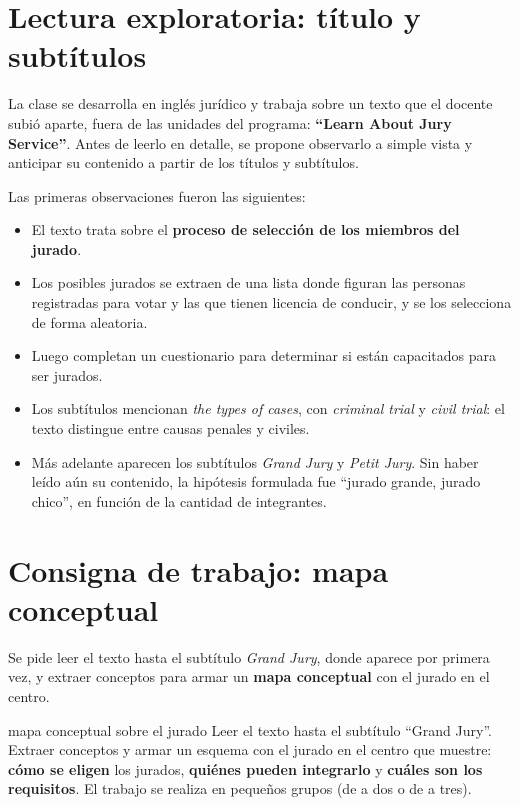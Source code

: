 \documentclass[12pt,oneside]{book}
\begin{document}
\section{Lectura exploratoria: título y subtítulos}

La clase se desarrolla en inglés jurídico y trabaja sobre un texto que el docente subió aparte, fuera de las unidades del programa: \textbf{``Learn About Jury Service''}. Antes de leerlo en detalle, se propone observarlo a simple vista y anticipar su contenido a partir de los títulos y subtítulos.

Las primeras observaciones fueron las siguientes:
\begin{itemize}
\item El texto trata sobre el \textbf{proceso de selección de los miembros del jurado}.
\item Los posibles jurados se extraen de una lista donde figuran las personas registradas para votar y las que tienen licencia de conducir, y se los selecciona de forma aleatoria.
\item Luego completan un cuestionario para determinar si están capacitados para ser jurados.
\item Los subtítulos mencionan \textit{the types of cases}, con \textit{criminal trial} y \textit{civil trial}: el texto distingue entre causas penales y civiles.
\item Más adelante aparecen los subtítulos \textit{Grand Jury} y \textit{Petit Jury}. Sin haber leído aún su contenido, la hipótesis formulada fue ``jurado grande, jurado chico'', en función de la cantidad de integrantes.
\end{itemize}

\section{Consigna de trabajo: mapa conceptual}

Se pide leer el texto hasta el subtítulo \textit{Grand Jury}, donde aparece por primera vez, y extraer conceptos para armar un \textbf{mapa conceptual} con el jurado en el centro.

\begin{exercise}{mapa conceptual sobre el jurado}
Leer el texto hasta el subtítulo ``Grand Jury''. Extraer conceptos y armar un esquema con el jurado en el centro que muestre: \textbf{cómo se eligen} los jurados, \textbf{quiénes pueden integrarlo} y \textbf{cuáles son los requisitos}. El trabajo se realiza en pequeños grupos (de a dos o de a tres).
\end{exercise}
\end{document}

